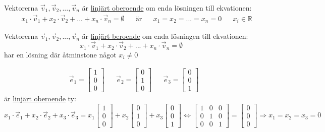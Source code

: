\begin{Def}
	Vektorerna $\vec{v}_1, \vec{v}_2,...,\vec{v}_n$ är \underline{linjärt oberoende} om enda lösningen till ekvationen:
	\begin{align*}
	&&x_1 \cdot \vec{v}_1 + x_2 \cdot \vec{v}_2 + ... + x_n \cdot \vec{v}_n	= \emptyset
	&&\mbox{är}
	&&x_1 = x_2 = ... = x_n = 0
	&&x_i \in \mathbb{R}
	\end{align*}
	
\end{Def}
\begin{Def}
	Vektorerna $\vec{v}_1, \vec{v}_2,...,\vec{v}_n$ är \underline{linjärt beroende} om enda lösningen till ekvationen:
	\[
	x_1 \cdot \vec{v}_1 + x_2 \cdot \vec{v}_2 + ... + x_n \cdot \vec{v}_n	= \emptyset
	\]
	har en lösning där åtminstone något $x_i \neq 0$
\end{Def}
\begin{Ex}
	\begin{align*}
	&\vec{e}_1 = \begin{bmatrix} 1\\0\\0 \end{bmatrix}
	&&\vec{e}_2 = \begin{bmatrix} 0\\1\\0 \end{bmatrix}
	&&\vec{e}_3	= \begin{bmatrix} 0\\0\\1 \end{bmatrix}
	\end{align*}
	är \underline{linjärt oberoende} ty:
	\[
	x_1 \cdot \vec{e}_1 + x_2 \cdot \vec{e}_2 + x_3 \cdot \vec{e}_3 = x_1 \begin{bmatrix} 1\\0\\0 \end{bmatrix} + x_2 \begin{bmatrix} 0\\1\\0 \end{bmatrix} + x_3 \begin{bmatrix} 0\\0\\1 \end{bmatrix} \Leftrightarrow \begin{bmatrix} 1&0&0\\0&1&0\\0&0&1 \end{bmatrix} = \begin{bmatrix} 0\\0\\0 \end{bmatrix} \Rightarrow x_1=x_2=x_3=0
	\]
\end{Ex}
